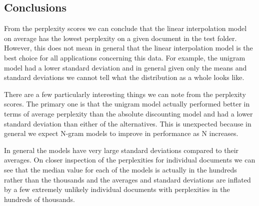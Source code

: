 \documentclass[paper=a4, fontsize=11pt]{jhwhw} %
\begin{document}
\subsection{Conclusions}
From the perplexity scores we can conclude that the linear interpolation model on average has 
the lowest perplexity on a given document in the test folder. However, this does not mean
in general that the linear interpolation model is the best choice for all applications concerning
this data. For example, the unigram model had a lower standard deviation and in general given only 
the means and standard deviations we cannot tell what the distribution as a whole looks like. 

There are a few particularly interesting things we can note from the perplexity scores. The primary one
is that the unigram model actually performed better in terms of average perplexity than the absolute 
discounting model and had a lower standard deviation than either of the
alternatives. This is unexpected because in general we expect N-gram models to improve in performance
as N increases. 

In general the models have very large standard deviations compared to their averages. On closer
inspection of the perplexities for individual documents we can see that the median value for each of
the models is actually in the hundreds rather than the thousands and the averages and standard deviations
are inflated by a few extremely unlikely individual documents with perplexities in the hundreds of thousands.
\end{document}
